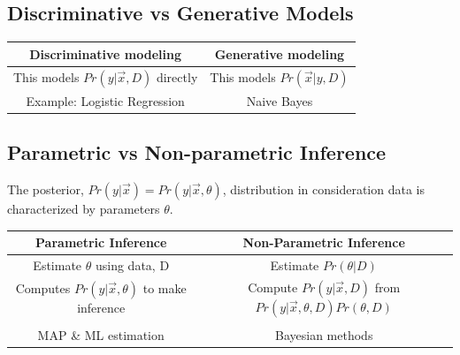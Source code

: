\documentclass[12pt]{article}
\numberwithin{equation}{section}
\begin{document}
\subsection{Discriminative vs Generative Models}
\begin{table}[!ht]
\begin{center}
\begin{tabular}{|c|c|}
\hline
\textbf{Discriminative modeling}  & \textbf{Generative modeling} \\ \hline
This models $Pr(y|\vec{x},D)$ directly & This models $Pr(\vec{x}|y,D)$ \\ \hline
Example: Logistic Regression & Naive Bayes\\ \hline
\end{tabular}
\end{center}
\label{default}
\end{table}%

\subsection{Parametric vs Non-parametric Inference}
The posterior, $Pr(y|\vec{x}) = Pr(y|\vec{x},\theta)$, distribution in consideration data is characterized by parameters $\theta$.

\begin{table}[!ht]
\begin{center}
\begin{tabular}{|c|c|}
\hline
\textbf{Parametric Inference}  & \textbf{Non-Parametric Inference} \\ \hline
Estimate $\theta$ using data, D & Estimate $Pr(\theta| D)$ \\ \hline
Computes $Pr(y|\vec{x},\theta)$ to make inference  & Compute $Pr(y | \vec{x},D)$ from $Pr(y | \vec{x},\theta, D) Pr(\theta, D)$\\ \hline
{\color{blue}{Learning corresponds to estimating $\theta$} } & {\color{red}{The number of parameters can grow with data} } \\  \hline
MAP \& ML estimation& Bayesian methods \\  \hline
\end{tabular}
\end{center}
\label{default}
\end{table}%
\end{document}
